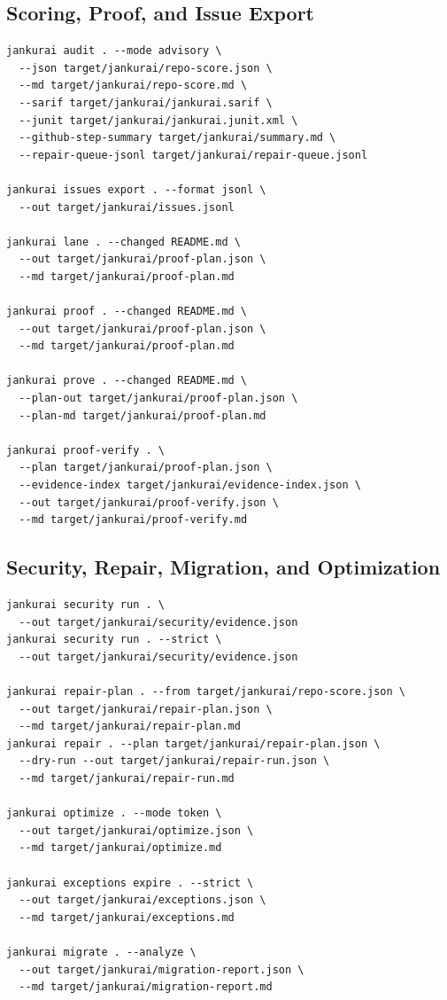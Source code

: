 \subsection{Scoring, Proof, and Issue Export}

\begin{lstlisting}[style=codebox]
jankurai audit . --mode advisory \
  --json target/jankurai/repo-score.json \
  --md target/jankurai/repo-score.md \
  --sarif target/jankurai/jankurai.sarif \
  --junit target/jankurai/jankurai.junit.xml \
  --github-step-summary target/jankurai/summary.md \
  --repair-queue-jsonl target/jankurai/repair-queue.jsonl

jankurai issues export . --format jsonl \
  --out target/jankurai/issues.jsonl

jankurai lane . --changed README.md \
  --out target/jankurai/proof-plan.json \
  --md target/jankurai/proof-plan.md

jankurai proof . --changed README.md \
  --out target/jankurai/proof-plan.json \
  --md target/jankurai/proof-plan.md

jankurai prove . --changed README.md \
  --plan-out target/jankurai/proof-plan.json \
  --plan-md target/jankurai/proof-plan.md

jankurai proof-verify . \
  --plan target/jankurai/proof-plan.json \
  --evidence-index target/jankurai/evidence-index.json \
  --out target/jankurai/proof-verify.json \
  --md target/jankurai/proof-verify.md
\end{lstlisting}

\subsection{Security, Repair, Migration, and Optimization}

\begin{lstlisting}[style=codebox]
jankurai security run . \
  --out target/jankurai/security/evidence.json
jankurai security run . --strict \
  --out target/jankurai/security/evidence.json

jankurai repair-plan . --from target/jankurai/repo-score.json \
  --out target/jankurai/repair-plan.json \
  --md target/jankurai/repair-plan.md
jankurai repair . --plan target/jankurai/repair-plan.json \
  --dry-run --out target/jankurai/repair-run.json \
  --md target/jankurai/repair-run.md

jankurai optimize . --mode token \
  --out target/jankurai/optimize.json \
  --md target/jankurai/optimize.md

jankurai exceptions expire . --strict \
  --out target/jankurai/exceptions.json \
  --md target/jankurai/exceptions.md

jankurai migrate . --analyze \
  --out target/jankurai/migration-report.json \
  --md target/jankurai/migration-report.md
\end{lstlisting}

